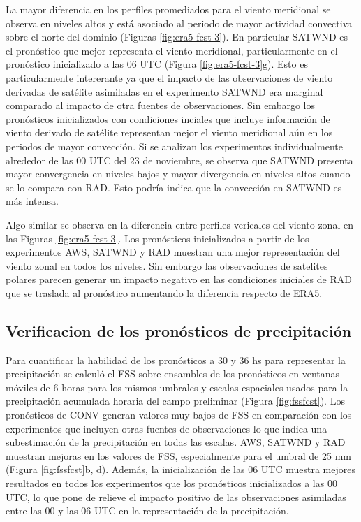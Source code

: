 \documentclass[12pt,oneside]{reedthesis}
\begin{document}
La mayor diferencia en los perfiles promediados para el viento meridional se observa en niveles altos y está asociado al periodo de mayor actividad convectiva sobre el norte del dominio (Figuras \ref{fig:era5-fcst-3}). En particular SATWND es el pronóstico que mejor representa el viento meridional, particularmente en el pronóstico inicializado a las 06 UTC (Figura \ref{fig:era5-fcst-3}g). Esto es particularmente intererante ya que el impacto de las observaciones de viento derivadas de satélite asimiladas en el experimento SATWND era marginal comparado al impacto de otra fuentes de observaciones. Sin embargo los pronósticos inicializados con condiciones inciales que incluye información de viento derivado de satélite representan mejor el viento meridional aún en los periodos de mayor convección. Si se analizan los experimentos individualmente alrededor de las 00 UTC del 23 de noviembre, se observa que SATWND presenta mayor convergencia en niveles bajos y mayor divergencia en niveles altos cuando se lo compara con RAD. Esto podría indica que la convección en SATWND es más intensa.

Algo similar se observa en la diferencia entre perfiles vericales del viento zonal en las Figuras \ref{fig:era5-fcst-3}. Los pronósticos inicializados a partir de los experimentos AWS, SATWND y RAD muestran una mejor representación del viento zonal en todos los niveles. Sin embargo las observaciones de satelites polares parecen generar un impacto negativo en las condiciones iniciales de RAD que se traslada al pronóstico aumentando la diferencia respecto de ERA5.

\hypertarget{verificacion-de-los-pronuxf3sticos-de-precipitaciuxf3n}{%
\subsection{Verificacion de los pronósticos de precipitación}\label{verificacion-de-los-pronuxf3sticos-de-precipitaciuxf3n}}

Para cuantificar la habilidad de los pronósticos a 30 y 36 hs para representar la precipitación se calculó el FSS sobre ensambles de los pronósticos en ventanas móviles de 6 horas para los mismos umbrales y escalas espaciales usados para la precipitación acumulada horaria del campo preliminar (Figura \ref{fig:fssfcst}). Los pronósticos de CONV generan valores muy bajos de FSS en comparación con los experimentos que incluyen otras fuentes de observaciones lo que indica una subestimación de la precipitación en todas las escalas. AWS, SATWND y RAD muestran mejoras en los valores de FSS, especialmente para el umbral de 25 mm (Figura \ref{fig:fssfcst}b, d). Además, la inicialización de las 06 UTC muestra mejores resultados en todos los experimentos que los pronósticos inicializados a las 00 UTC, lo que pone de relieve el impacto positivo de las observaciones asimiladas entre las 00 y las 06 UTC en la representación de la precipitación.
\end{document}
